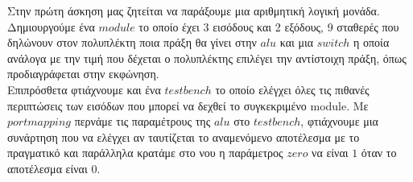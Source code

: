 Στην πρώτη άσκηση μας ζητείται να παράξουμε μια αριθμητική λογική μονάδα. 
Δημιουργούμε ένα $module$ το οποίο έχει 3 εισόδους και 2 εξόδους, 9 σταθερές
που δηλώνουν στον πολυπλέκτη ποια πράξη θα γίνει στην $alu$ και μια $switch$ 
η οποία ανάλογα με την τιμή που δέχεται ο πολυπλέκτης επιλέγει την αντίστοιχη
πράξη, όπως προδιαγράφεται στην εκφώνηση.
\\
Επιπρόσθετα φτιάχνουμε και ένα $testbench$ το οποίο ελέγχει όλες τις πιθανές
περιπτώσεις των εισόδων που μπορεί να δεχθεί το συγκεκριμένο module. Με $port
mapping$ περνάμε τις παραμέτρους της $alu$ στο $testbench$, φτιάχνουμε μια
συνάρτηση που να ελέγχει αν ταυτίζεται το αναμενόμενο αποτέλεσμα με το πραγματικό
και παράλληλα κρατάμε στο νου η παράμετρος $zero$ να είναι $1$ όταν το αποτέλεσμα
είναι $0$.